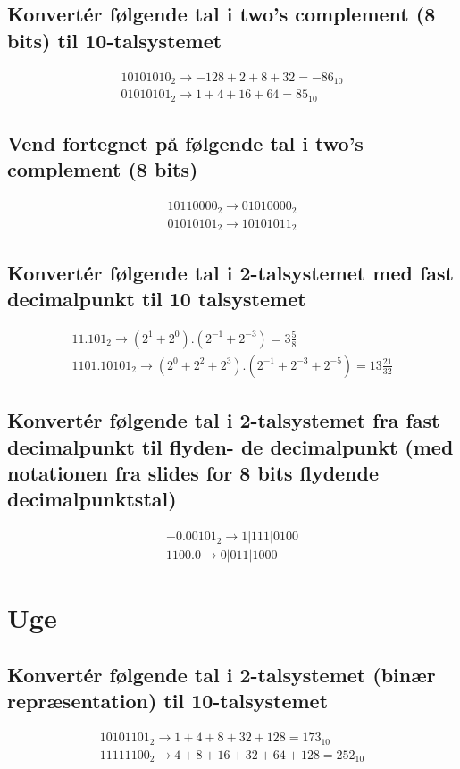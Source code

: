 \documentclass[12pt, a4paper]{article}
\begin{document}
			\subsection{Konvertér følgende tal i two’s complement (8 bits) til 10-talsystemet}
			\begin{align*}
				1010 1010_2 \rightarrow -128+2+8+32=-86_{10}\\
				01010101_2 \rightarrow 1+4+16+64 = 85_{10}
			\end{align*}
			\subsection{Vend fortegnet på følgende tal i two’s complement (8 bits)}
			\begin{align*}
				1011 0000_2 \rightarrow 0101 0000_2\\
				0101 0101_2 \rightarrow 1010 1011_2
			\end{align*}
			\subsection{Konvertér følgende tal i 2-talsystemet med fast decimalpunkt til 10 talsystemet}
			\begin{align*}
				11.101_2 \rightarrow (2^1+2^0).(2^{-1}+2^{-3})=3\frac{5}{8}\\
				1101.10101_2 \rightarrow (2^0+2^2+2^3).(2^{-1}+2^{-3}+2^{-5})=13\frac{21}{32}
			\end{align*}
			\subsection{Konvertér følgende tal i 2-talsystemet fra fast decimalpunkt til flyden-
de decimalpunkt (med notationen fra slides for 8 bits flydende decimalpunktstal)}
			\begin{align*}
				-0.00101_2 \rightarrow 1|111|0100\\
				1100.0 \rightarrow 0|011|1000
			\end{align*}
		\section{Uge}
			\subsection{	Konvertér følgende tal i 2-talsystemet (binær repræsentation) til 10-talsystemet}
				\begin{align*}
					10101101_2\rightarrow 1+4+8+32+128 = 173_{10}\\
					11111100_2 \rightarrow 4+8+16+32+64+128=252_{10}
				\end{align*}
\end{document}
